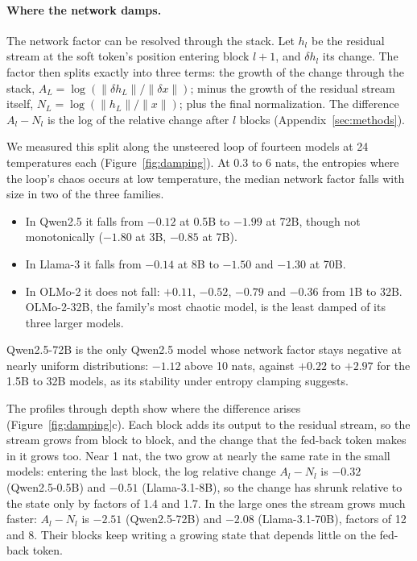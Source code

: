 \documentclass[11pt,letterpaper]{article}
\begin{document}
\paragraph{Where the network damps.} The network factor can be resolved through the stack. Let $h_l$ be the residual
stream at the soft token's position entering block $l+1$, and $\delta h_l$ its change. The factor then splits exactly
into three terms: the growth of the change through the stack, $A_L=\log(\lVert\delta h_L\rVert/\lVert\delta x\rVert)$;
minus the growth of the residual stream itself, $N_L=\log(\lVert h_L\rVert/\lVert x\rVert)$; plus the final
normalization. The difference $A_l-N_l$ is the log of the relative change after $l$ blocks (Appendix~\ref{sec:methods}).

We measured this split along the unsteered loop of fourteen models at 24 temperatures each
(Figure~\ref{fig:damping}). At 0.3 to 6 nats, the entropies where the loop's chaos occurs at low temperature, the
median network factor falls with size in two of the three families.
\begin{itemize}
  \item In Qwen2.5 it falls from $-0.12$ at 0.5B to $-1.99$ at 72B, though not monotonically ($-1.80$ at 3B, $-0.85$ at
  7B).
  \item In Llama-3 it falls from $-0.14$ at 8B to $-1.50$ and $-1.30$ at 70B.
  \item In OLMo-2 it does not fall: $+0.11$, $-0.52$, $-0.79$ and $-0.36$ from 1B to 32B. OLMo-2-32B, the family's most
  chaotic model, is the least damped of its three larger models.
\end{itemize}
Qwen2.5-72B is the only Qwen2.5 model whose network factor stays negative at nearly uniform distributions: $-1.12$ above
10 nats, against $+0.22$ to $+2.97$ for the 1.5B to 32B models, as its stability under entropy clamping suggests.

The profiles through depth show where the difference arises (Figure~\ref{fig:damping}c). Each block adds its output
to the residual stream, so the stream grows from block to block, and the change that the fed-back token makes in it
grows too. Near 1 nat, the two grow at nearly the same rate in the small models: entering the last block, the log
relative change $A_l-N_l$ is $-0.32$ (Qwen2.5-0.5B) and $-0.51$ (Llama-3.1-8B), so the change has shrunk relative to
the state only by factors of 1.4 and 1.7. In the large ones the stream grows much faster: $A_l-N_l$ is $-2.51$
(Qwen2.5-72B) and $-2.08$ (Llama-3.1-70B), factors of 12 and 8. Their blocks keep writing a growing state that
depends little on the fed-back token.
\end{document}
